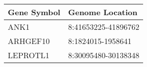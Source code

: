 \begin{tabular}{ll}
\toprule
Gene Symbol &     Genome Location \\
\midrule
       ANK1 & 8:41653225-41896762 \\
   ARHGEF10 &   8:1824015-1958641 \\
   LEPROTL1 & 8:30095480-30138348 \\
\bottomrule
\end{tabular}
